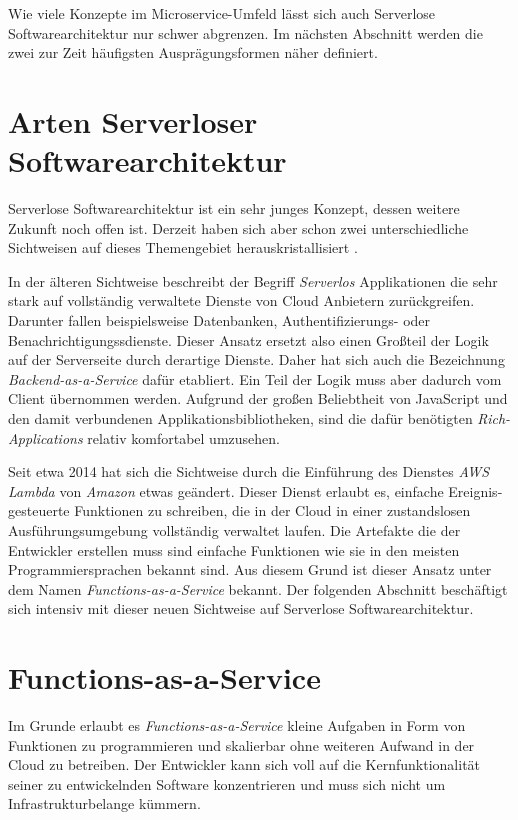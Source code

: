 Wie viele Konzepte im Microservice-Umfeld lässt sich auch Serverlose Softwarearchitektur nur schwer abgrenzen. Im nächsten Abschnitt werden die zwei zur Zeit häufigsten Ausprägungsformen näher definiert.

\section{Arten Serverloser Softwarearchitektur}

Serverlose Softwarearchitektur ist ein sehr junges Konzept, dessen weitere Zukunft noch offen ist. Derzeit haben sich aber schon zwei unterschiedliche Sichtweisen auf dieses Themengebiet herauskristallisiert \cite{ServerlessArchitectures}.

In der älteren Sichtweise beschreibt der Begriff \textit{Serverlos} Applikationen die sehr stark auf vollständig verwaltete Dienste von Cloud Anbietern zurückgreifen. Darunter fallen beispielsweise Datenbanken, Authentifizierungs- oder Benachrichtigungssdienste. Dieser Ansatz ersetzt also einen Großteil der Logik auf der Serverseite durch derartige Dienste. Daher hat sich auch die Bezeichnung \textit{Backend-as-a-Service} dafür etabliert. Ein Teil der Logik muss aber dadurch vom Client übernommen werden. Aufgrund der großen Beliebtheit von JavaScript und den damit verbundenen Applikationsbibliotheken, sind die dafür benötigten \textit{Rich-Applications} relativ komfortabel umzusehen.

Seit etwa 2014 hat sich die Sichtweise durch die Einführung des Dienstes \textit{AWS Lambda} von \textit{Amazon} etwas geändert. Dieser Dienst erlaubt es, einfache Ereignis-gesteuerte Funktionen zu schreiben, die in der Cloud in einer zustandslosen Ausführungsumgebung vollständig verwaltet laufen. Die Artefakte die der Entwickler erstellen muss sind einfache Funktionen wie sie in den meisten Programmiersprachen bekannt sind. Aus diesem Grund ist dieser Ansatz unter dem Namen \textit{Functions-as-a-Service} bekannt. Der folgenden Abschnitt beschäftigt sich intensiv mit dieser neuen Sichtweise auf Serverlose Softwarearchitektur.

\section{Functions-as-a-Service}

Im Grunde erlaubt es \textit{Functions-as-a-Service} kleine Aufgaben in Form von Funktionen zu programmieren und skalierbar ohne weiteren Aufwand in der Cloud zu betreiben. Der Entwickler kann sich voll auf die Kernfunktionalität seiner zu entwickelnden Software konzentrieren und muss sich nicht um Infrastrukturbelange kümmern.

